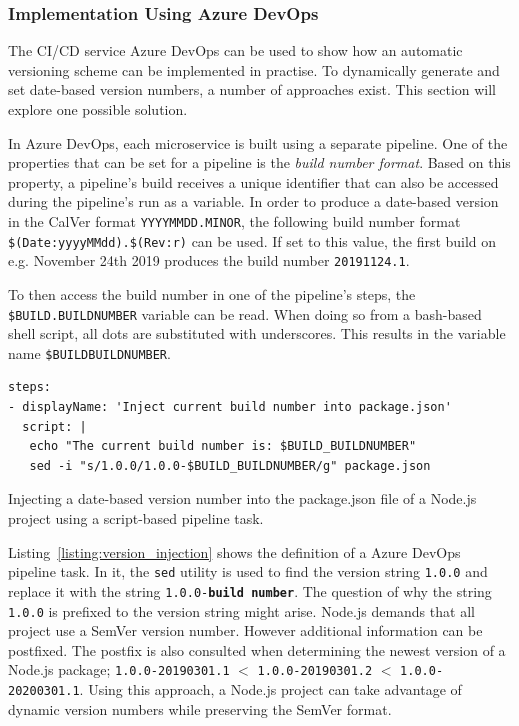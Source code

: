 \subsubsection{Implementation Using Azure DevOps}%
\label{ssub:Implementation_Using_Azure_DevOps}
The \ac{CI}/\ac{CD} service Azure DevOps can be used to show how an automatic
versioning scheme can be implemented in practise. To dynamically generate and
set date-based version numbers, a number of approaches exist. This section will
explore one possible solution.

In Azure DevOps, each microservice is built using a separate pipeline. One of
the properties that can be set for a pipeline is the \textit{build number
format}. Based on this property, a pipeline's build receives a unique identifier
that can also be accessed during the pipeline's run as a variable. In order to
produce a date-based version in the CalVer format \texttt{YYYYMMDD.MINOR}, the
following build number format \texttt{\$(Date:yyyyMMdd).\$(Rev:r)} can be used.
If set to this value, the first build on e.g. November 24th 2019 produces the
build number \texttt{20191124.1}.

To then access the build number in one of the pipeline's steps, the
\texttt{\$BUILD.BUILDNUMBER} variable can be read. When doing so from a
bash-based shell script, all dots are substituted with underscores. This
results in the variable name \texttt{\$BUILD\textunderscrore BUILDNUMBER}.

\begin{listing}[H]
  \begin{verbatim}
steps:
- displayName: 'Inject current build number into package.json'
  script: |
   echo "The current build number is: $BUILD_BUILDNUMBER"
   sed -i "s/1.0.0/1.0.0-$BUILD_BUILDNUMBER/g" package.json
  \end{verbatim}
  \caption{Injecting a date-based version number into the package.json file of
  a Node.js project using a script-based pipeline task.}%
  \label{listing:version_injection}
\end{listing}

Listing~\ref{listing:version_injection} shows the definition of a Azure DevOps
pipeline task. In it, the \texttt{sed} utility is used to find the version
string \texttt{1.0.0} and replace it with the string
\texttt{1.0.0-\textbf{build number}}. The question of why the string
\texttt{1.0.0} is prefixed to the version string might arise. Node.js demands
that all project use a SemVer version number. However additional information
can be postfixed. The postfix is also consulted when determining the newest
version of a Node.js package; \texttt{1.0.0-20190301.1} $<$
\texttt{1.0.0-20190301.2} $<$ \texttt{1.0.0-20200301.1}. Using this approach, a
Node.js project can take advantage of dynamic version numbers while preserving
the SemVer format.

